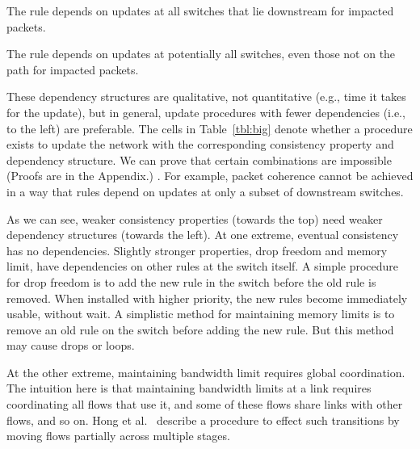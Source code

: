  The rule depends on updates at all switches that lie downstream for impacted packets.

 The rule depends on updates at potentially all switches, even those not on the path for impacted packets.




These dependency structures are qualitative, not quantitative (e.g., time it takes for the update), but in general, update procedures with fewer dependencies (i.e., to the left) are preferable. The cells in Table~\ref{tbl:big} denote whether a procedure exists to update the network with the corresponding consistency property and dependency structure. We can prove that certain combinations are impossible
\iflongversion
(Proofs are in the Appendix.)
\else
\cite{tr}.
\fi
For example, packet coherence cannot be achieved in a way that rules depend on updates at only a subset of downstream switches.

As we can see,  weaker consistency properties (towards the top) need weaker dependency structures (towards the left). At one extreme, eventual consistency has no dependencies.  Slightly stronger properties, drop freedom and memory limit, have dependencies on other rules at the switch itself. A simple procedure for drop freedom is to add the new rule in the switch before the old rule is removed. When installed with higher priority, the new rules become immediately usable, without wait.
A simplistic method for maintaining memory limits is to remove an old rule on the switch before adding the new rule. But this method may cause drops or loops.

At the other extreme, maintaining bandwidth limit requires global coordination. The intuition here is that maintaining bandwidth limits at a link requires coordinating all flows that use it, and some of these flows share links with other flows, and so on. Hong et al.~\cite{swan} describe a procedure to effect such transitions by moving flows partially across multiple stages.

